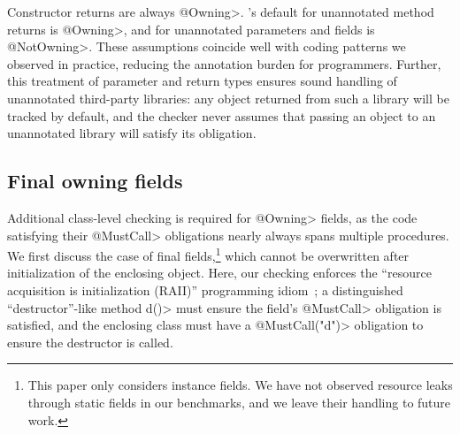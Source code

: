 Constructor returns are always \<@Owning>.
\Tool's default for unannotated method returns is \<@Owning>,
and for unannotated parameters and fields is \<@NotOwning>.  These assumptions
coincide well with coding patterns we observed in practice, reducing the
annotation burden for programmers.  Further, this treatment of parameter and
return types ensures sound handling of unannotated third-party libraries: any
object returned from such a library will be tracked by default, and the checker
never assumes that passing an object to an unannotated library will satisfy its obligation.



\subsection{Final owning fields}
\label{sec:owning-fields}

  Additional class-level checking is required for \<@Owning>
  fields, as the code
  satisfying their \<@MustCall> obligations nearly always spans multiple
  procedures.  We first discuss the case of final fields,\footnote{This paper only
  considers instance fields.  We have not observed resource leaks
  through static fields in our benchmarks, and we leave their handling to future
  work.} which cannot be overwritten after initialization of the enclosing
  object.  Here, our checking enforces the ``resource acquisition is
  initialization (RAII)'' programming idiom~\cite{raii}; a distinguished
  ``destructor''-like method \<d()> must ensure the field's \<@MustCall> obligation is
  satisfied, and the enclosing class must have a \<@MustCall("d")> obligation to
  ensure the destructor is called.


